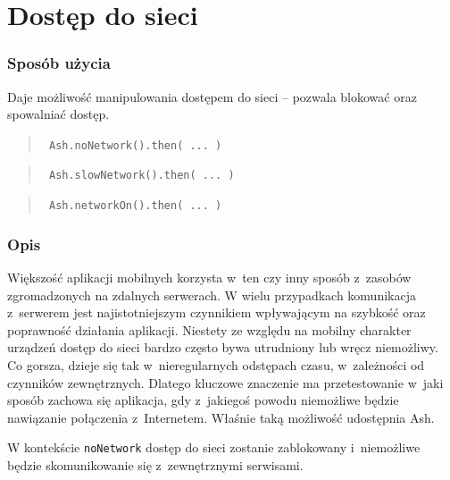 \documentclass{xmgr}
\begin{document}
\section{Dostęp do sieci}

\subsubsection{Sposób użycia}

Daje możliwość manipulowania dostępem do sieci -- pozwala blokować oraz spowalniać dostęp.

\begin{quote}
  \texttt{  Ash.noNetwork().then( ... )  } 
\end{quote}

\begin{quote}
  \texttt{  Ash.slowNetwork().then( ... )  }
\end{quote}

\begin{quote}
  \texttt{  Ash.networkOn().then( ... )  } 
\end{quote}

\subsubsection{Opis}

Większość aplikacji mobilnych korzysta w~ten czy inny sposób z~zasobów zgromadzonych na zdalnych serwerach. W wielu przypadkach komunikacja z~serwerem jest najistotniejszym czynnikiem wpływającym na szybkość oraz poprawność działania aplikacji. Niestety ze względu na mobilny charakter urządzeń dostęp do sieci bardzo często bywa utrudniony lub wręcz niemożliwy. Co gorsza, dzieje się tak w~nieregularnych odstępach czasu, w~zależności od czynników zewnętrznych. Dlatego kluczowe znaczenie ma przetestowanie w~jaki sposób zachowa się aplikacja, gdy z~jakiegoś powodu niemożliwe będzie nawiązanie połączenia z~Internetem. Właśnie taką możliwość udostępnia Ash. 


W kontekście \texttt{noNetwork} dostęp do sieci zostanie zablokowany i~niemożliwe będzie skomunikowanie się z~zewnętrznymi serwisami.
\end{document}
